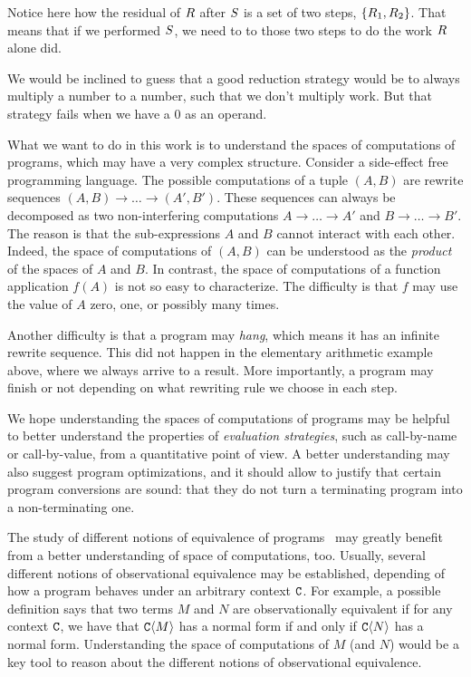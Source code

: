 Notice here how the residual of $R$ after $S$ is a set of two steps, $\{R_1, R_2\}$.
That means that if we performed $S$, we need to to those two steps to do the work $R$ alone did.

We would be inclined to guess that a good reduction strategy would be to always multiply
a number to a number, such that we don't multiply work. But that strategy fails when we have a 0 as an operand.

\bigskip


What we want to do in this work is to understand the spaces of computations of programs,
which may have a very complex structure.
Consider a side-effect free programming language.
The possible computations of a tuple $(A,B)$
are rewrite sequences $(A,B) \to \hdots \to (A',B')$.
These sequences can always be decomposed as two non-interfering computations
$A \to \hdots \to A'$ and $B \to \hdots \to B'$.
The reason is that the sub-expressions $A$ and $B$ cannot interact with each other.
Indeed, the space of computations of $(A,B)$ can be understood as
the {\em product} of the spaces of $A$ and $B$.
In contrast, the space of computations of a function application $f(A)$ is not so easy
to characterize. The difficulty is that $f$ may use the value of $A$ zero, one, or
possibly many times.

Another difficulty is that a program may \emph{hang}, which means it has an infinite rewrite sequence.
This did not happen in the elementary arithmetic example above, where we always arrive to a result.
More importantly, a program may finish or not depending on what rewriting rule we choose in each step.

We hope understanding the spaces of computations of programs
may be helpful to better understand the properties of {\em evaluation strategies},
such as call-by-name or call-by-value,
from a quantitative point of view.
A better understanding may also suggest program optimizations,
and it should allow to justify that certain program conversions are sound:
\eg that they do not turn a terminating program into a non-terminating one.

The study of different notions of equivalence of programs~\cite{Tesis:Morris,Bre16}
may greatly benefit from a better understanding of space of computations, too.
Usually, several different notions of observational equivalence may be
established, depending of how a program behaves under an arbitrary context $\mathtt{C}$.
For example, a possible definition says that two terms $M$ and $N$
are observationally equivalent if for any context $\mathtt{C}$, we have that
$\mathtt{C}\langle M\rangle$ has a normal form if and only if $\mathtt{C}\langle N\rangle$ has a normal form.
Understanding the space of computations of $M$ (and $N$) would be a key
tool to reason about the different notions of observational equivalence.

